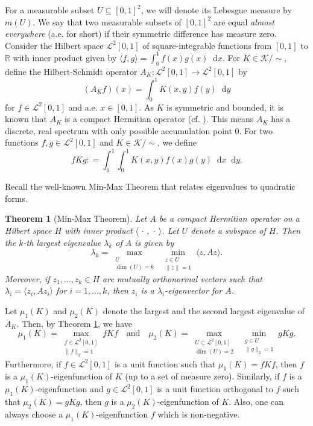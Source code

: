 \documentclass[11pt]{article}
\theoremstyle{plain}
\newtheorem{theorem}{Theorem}[section]
\theoremstyle{definition}
\numberwithin{equation}{section}
\newcommand{\dif}{\mathop{}\!\mathrm{d}}
\begin{document}
For a measurable subset $U\subseteq [0,1]^2$, we will denote its Lebesgue measure by $m(U)$. 
We say that two measurable subsets of $[0,1]^2$ are equal \emph{almost everywhere} (a.e. for short) 
if their symmetric difference has measure zero. Consider the Hilbert space $\mathscr{L}^2[0,1]$ 
of square-integrable functions from $[0,1]$ to $\mathbb{R}$ with inner product given by 
$\langle f,g\rangle = \int_0^1 f(x)g(x)\dif{x}$. For $K\in \mathcal{K}/\sim$, define the 
Hilbert-Schmidt operator $A_K: \mathscr{L}^2[0,1]\rightarrow \mathscr{L}^2[0,1]$ by 
\[ 
(A_Kf)(x) = \int_0^1 K(x,y)f(y)\dif{y}
\]
for $f\in \mathscr{L}^2[0,1]$ and a.e. $x\in [0,1]$. As $K$ is symmetric and bounded, 
it is known that $A_K$ is a compact Hermitian operator (cf. \cite{Aubin_2000}). 
This means $A_K$ has a discrete, real spectrum with only possible accumulation point $0$. 
For two functions $f,g\in \mathscr{L}^2[0,1]$ and $K\in \mathcal{K}/\sim$, we define 
\[ 
fKg : = \int_0^1\!\int_0^1 K(x,y)f(x)g(y)\dif{x}\dif{y}.
\]

Recall the well-known Min-Max Theorem that relates eigenvalues to quadratic forms. 

\begin{theorem}[Min-Max Theorem]\label{thm:min_max} 
Let $A$ be a compact Hermitian operator on a Hilbert space $H$ with inner product 
$\langle\,\cdot\,, \,\cdot\,\rangle$. Let $U$ denote a subspace of $H$. 
Then the $k$-th largest eigenvalue $\lambda_k$ of $A$ is given by
\[ 
\lambda_k = \max_{\substack{U\\ \dim(U)=k}} ~ \min_{\substack{z\in U\\ \|z\|=1}} \langle z, A z\rangle.
\]
Moreover, if $z_1, \ldots, z_k\in H$ are mutually orthonormal vectors such that 
$\lambda_i = \langle z_i, A z_i\rangle$ for $i=1, \ldots, k$, then $z_i$ is a $\lambda_i$-eigenvector for $A$.  
\end{theorem}

Let $\mu_1(K)$ and $\mu_2(K)$ denote the largest and the second largest eigenvalue of $A_K$. 
Then, by Theorem \ref{thm:min_max}, we have   
\begin{equation}\label{eq:min-max-graphon}
 \mu_1(K) = \max_{\substack{f\in \mathscr{L}^2[0,1] \\ \| f\|_2=1}} fKf \quad \text{and}\quad
 \mu_2(K) = \max_{\substack{U\subset \mathscr{L}^2[0,1]\\ \dim(U)=2}} ~ \min_{\substack{g\in U \\ \| g\|_2=1}} gKg.
\end{equation}
Furthermore, if $f\in \mathscr{L}^2[0,1]$ is a unit function such that $\mu_1(K) = fKf$, 
then $f$ is a $\mu_1(K)$-eigenfunction of $K$ (up to a set of measure zero). Similarly, 
if $f$ is a $\mu_1(K)$-eigenfunction and $g\in \mathscr{L}^2[0,1]$ is a unit function 
orthogonal to $f$ such that $\mu_2(K) = gKg$, then $g$ is a $\mu_2(K)$-eigenfunction 
of $K$. Also, one can always choose a $\mu_1(K)$-eigenfunction $f$ which is non-negative. 
\end{document}
